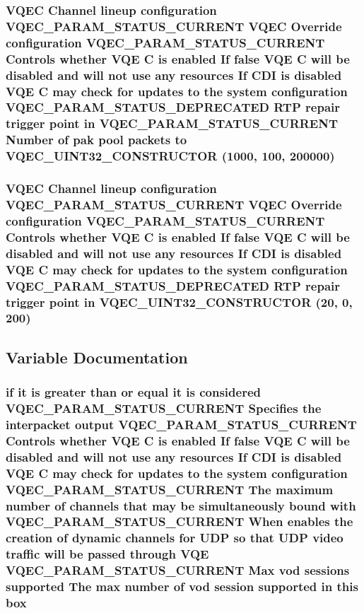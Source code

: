\subsubsection{\setlength{\rightskip}{0pt plus 5cm}VQEC Channel lineup configuration VQEC\_\-PARAM\_\-STATUS\_\-CURRENT VQEC Override configuration VQEC\_\-PARAM\_\-STATUS\_\-CURRENT Controls whether VQE \bf{C} is enabled If false VQE \bf{C} will be disabled and will not use any resources If CDI is disabled VQE \bf{C} may check for updates \bf{to} the system configuration VQEC\_\-PARAM\_\-STATUS\_\-DEPRECATED RTP repair trigger point in VQEC\_\-PARAM\_\-STATUS\_\-CURRENT Number of pak pool packets \bf{to} VQEC\_\-UINT32\_\-CONSTRUCTOR (1000, 100, 200000)}\label{vqec__cfg__settings_8h_82888791bd1f6ffd244cfcc8c93f0595}


\subsubsection{\setlength{\rightskip}{0pt plus 5cm}VQEC Channel lineup configuration VQEC\_\-PARAM\_\-STATUS\_\-CURRENT VQEC Override configuration VQEC\_\-PARAM\_\-STATUS\_\-CURRENT Controls whether VQE \bf{C} is enabled If false VQE \bf{C} will be disabled and will not use any resources If CDI is disabled VQE \bf{C} may check for updates \bf{to} the system configuration VQEC\_\-PARAM\_\-STATUS\_\-DEPRECATED RTP repair trigger point in VQEC\_\-UINT32\_\-CONSTRUCTOR (20, 0, 200)}\label{vqec__cfg__settings_8h_e9146310da81672060e905b491c06de7}




\subsection{Variable Documentation}
\subsubsection{\setlength{\rightskip}{0pt plus 5cm}if it is greater than or equal it is considered VQEC\_\-PARAM\_\-STATUS\_\-CURRENT Specifies the interpacket output VQEC\_\-PARAM\_\-STATUS\_\-CURRENT Controls whether VQE \bf{C} is enabled If false VQE \bf{C} will be disabled and will not use any resources If CDI is disabled VQE \bf{C} may check for updates \bf{to} the system configuration VQEC\_\-PARAM\_\-STATUS\_\-CURRENT The maximum number of \bf{channels} that may be simultaneously bound with VQEC\_\-PARAM\_\-STATUS\_\-CURRENT When enables the creation of dynamic \bf{channels} for UDP so that UDP video traffic will be passed through VQE VQEC\_\-PARAM\_\-STATUS\_\-CURRENT Max vod sessions supported The max number of vod session supported in \bf{this} \bf{box}}\label{vqec__cfg__settings_8h_3bd04bf50f5d41e7652f55a6b5a7a4b8}


